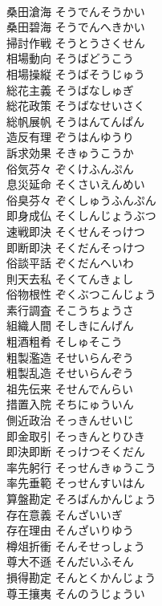 \documentclass[8pt]{extreport}
\begin{document}
\begin{CJK}{UTF8}{min}
\\	桑田滄海	そうでんそうかい	
\\	桑田碧海	そうでんへきかい	
\\	掃討作戦	そうとうさくせん	
\\	相場動向	そうばどうこう	
\\	相場操縦	そうばそうじゅう	
\\	総花主義	そうばなしゅぎ	
\\	総花政策	そうばなせいさく	
\\	総帆展帆	そうはんてんぱん	
\\	造反有理	ぞうはんゆうり	
\\	訴求効果	そきゅうこうか	
\\	俗気芬々	ぞくけふんぷん	
\\	息災延命	そくさいえんめい	
\\	俗臭芬々	ぞくしゅうふんぷん	
\\	即身成仏	そくしんじょうぶつ	
\\	速戦即決	そくせんそっけつ	
\\	即断即決	そくだんそっけつ	
\\	俗談平話	ぞくだんへいわ	
\\	則天去私	そくてんきょし	
\\	俗物根性	ぞくぶつこんじょう	
\\	素行調査	そこうちょうさ	
\\	組織人間	そしきにんげん	
\\	粗酒粗肴	そしゅそこう	
\\	粗製濫造	そせいらんぞう	
\\	粗製乱造	そせいらんぞう	
\\	祖先伝来	そせんでんらい	
\\	措置入院	そちにゅういん	
\\	側近政治	そっきんせいじ	
\\	即金取引	そっきんとりひき	
\\	即決即断	そっけつそくだん	
\\	率先躬行	そっせんきゅうこう	
\\	率先垂範	そっせんすいはん	
\\	算盤勘定	そろばんかんじょう	
\\	存在意義	そんざいいぎ	
\\	存在理由	そんざいりゆう	
\\	樽俎折衝	そんそせっしょう	
\\	尊大不遜	そんだいふそん	
\\	損得勘定	そんとくかんじょう	
\\	尊王攘夷	そんのうじょうい	

\end{CJK}
\end{document}

